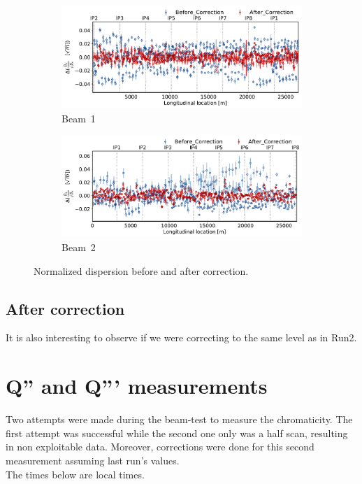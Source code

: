 \documentclass[a4paper]{cernatsnote}
\begin{document}
\begin{figure}[ht]
\begin{subfigure}{.5\textwidth}
  \centering
  \includegraphics[width=.8\linewidth]{plots/beam1/Normalized_disp_before_vs_after_corection.pdf}  
  \caption{Beam~1}
  \label{fig:sub-first}
\end{subfigure}
\begin{subfigure}{.5\textwidth}
  \centering
  \includegraphics[width=.8\linewidth]{plots/beam2/ndisp_before_after_correction.pdf}  
  \caption{Beam~2}
  \label{fig:sub-second}
\end{subfigure}
\caption{Normalized dispersion before and after correction.}
\label{fig:before_after_correction_beta_beat}
\end{figure}

\subsection{After correction}
It is also interesting to observe if we were correcting to the same level as in Run2. 

\clearpage
\section{Q'' and Q''' measurements}

Two attempts were made during the beam-test to measure the chromaticity. The first attempt was successful while the second one only was a half scan, resulting in non exploitable data. Moreover, corrections were done for this second measurement assuming last run's values.\\
The times below are local times.
\end{document}
